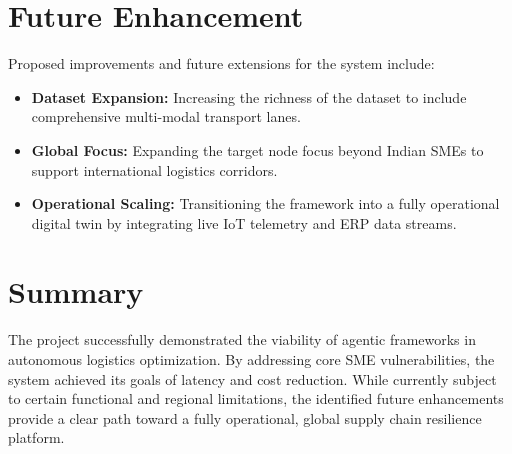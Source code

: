 \section[Future Enhancement]{Future Enhancement}
Proposed improvements and future extensions for the system include:
\begin{itemize}
    \item \textbf{Dataset Expansion:} Increasing the richness of the dataset to include comprehensive multi-modal transport lanes.
    \item \textbf{Global Focus:} Expanding the target node focus beyond Indian SMEs to support international logistics corridors.
    \item \textbf{Operational Scaling:} Transitioning the framework into a fully operational digital twin by integrating live IoT telemetry and ERP data streams.
\end{itemize}

\section[Summary]{Summary}
The project successfully demonstrated the viability of agentic frameworks in autonomous logistics optimization. By addressing core SME vulnerabilities, the system achieved its goals of latency and cost reduction. While currently subject to certain functional and regional limitations, the identified future enhancements provide a clear path toward a fully operational, global supply chain resilience platform.




